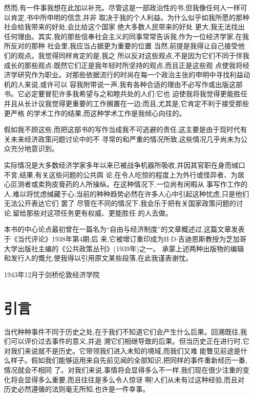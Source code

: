 ﻿\documentclass[12pt]{article}
\begin{document}
然而,有一件事我想在此加以补充。尽管这是一部政治性的书,但我像任何人一样可以肯定,书中所申明的信念,并非
取决于我的个人利益。为什么似乎如我所愿的那种社会给我带来的好处,会比给这个国家 绝大多数人民带来的好处
更大,我无法找出任何理由。其实,我的那些信奉社会主义的同事常常告诉我,作为一位经济学家,在我所反对的那种
社会里,我应当占据更为重要的位置 \myrule 当然,前提是我得让自己接受他们的观点。我觉得同样肯定的是,我之
所以反对这些观点,不是因为它们不同于伴我成长的那些观点:既然它们正是我年轻时所坚持的观点,而且正是这些观
点使我将经济学研究作为职业。对那些依据流行的时尚在每一个政治主张的申明中寻找利益动机的人来说,或许可以
容我附带说一声,我有各种合适的理由不必写作或出版这部书。它必定要冒犯许多我希望与之和睦共处的人们:它也
迫使我将我觉得更能胜任并且从长计议我觉得更重要的工作搁置在一边;而且,尤其是,它肯定不利于接受那些更严格
的学术工作的结果,而这种学术工作是我倾心向往的。

假如我不顾这些,而把这部书的写作当成我不可逃避的责任,这主要是由于现时代有关未来经济政策问题讨论中的不
寻常的和严重的情况所致,这些情况几乎尚未为公众充分地意识到。

实际情况是大多数经济学家多年以来已被战争机器所吸收,并因其官职在身而缄口不言,结果,有关这些问题的公共舆
论,在令人吃惊的程度上为外行或怪异者、为居心叵测者或卖狗皮膏药的人所操纵。在这种情况下,一位尚有闲暇从
事写作工作的人,难以将忧虑缄藏于心;当前的种种趋势必然在许多人心中引起这种忧虑,只是他们无法公开表达它们
罢了 \myrule 尽管在不同的情况下,我会乐于把有关国家政策问题的讨论,留给那些对这项任务更有权威、更能胜任
的人去做。

本书的中心论点最初曾在一篇名为``自由与经济制度''的文章概述过,这篇文章发表于《当代评论》1938年第4期;后
来,它被增订重印成为H$\cdot$D$\cdot$吉迪恩斯教授为芝加哥大学出版社主编的《公共政策丛刊》(1939年)之一。
承蒙上述两种出版物的编辑和发行人的慨允,使我得以引用原文某些段落,在此我谨表谢忱。

1943年12月于剑桥伦敦经济学院

\section{引言}

当代种种事件不同于历史之处,在于我们不知道它们会产生什么后果。回溯既往,我们可以评价过去事件的意义,并追
溯它们相继导致的后果。但当历史正在进行时,它对我们来说就不是历史。它带领我们进入未知的境域,而我们又难
能瞥见前途是什么样子。假如我们能够运用来自先前见闻的全部知识,把同样的事件重新经历一番,情况就会不相同
了。对我们来说,事情将会显得多么不一样,我们现在很少注重的变化将会显得多么重要,而且往往是多么令人惊讶
啊!人们从未有过这种经验,而且对历史必然遵循的法则毫无所知,也许是一件幸事。
\end{document}
